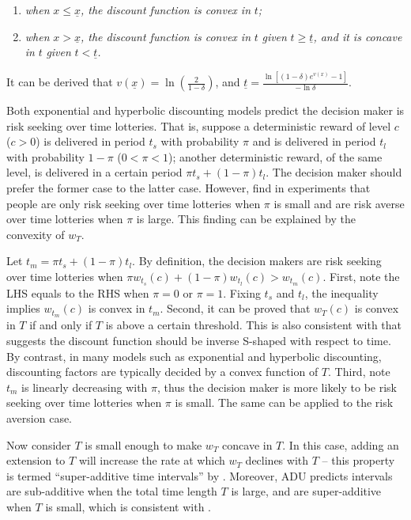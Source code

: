 \documentclass[
  12pt,
]{article}
\providecommand{\tightlist}{%
  \setlength{\itemsep}{0pt}\setlength{\parskip}{0pt}}
\begin{document}
\begin{enumerate}
\def\labelenumi{\arabic{enumi})}
\tightlist
\item
  \emph{when} \(x\leq \underline{x}\)\emph{, the discount function is
  convex in} \(t\)\emph{;}
\item
  \emph{when} \(x > \underline{x}\)\emph{, the discount function is
  convex in} \(t\) \emph{given} \(t\geq \underline{t}\)\emph{, and it is
  concave in} \(t\) \emph{given} \(t<\underline{t}\)\emph{.}
\end{enumerate}

It can be derived that \(v(\underline{x})=\ln(\frac{2}{1-\delta})\), and
\(\underline{t}=\frac{\ln[(1-\delta)e^{v(x)}-1]}{-\ln\delta}\).

Both exponential and hyperbolic discounting models predict the decision
maker is risk seeking over time lotteries. That is, suppose a
deterministic reward of level \(c\) (\(c>0\)) is delivered in period
\(t_s\) with probability \(\pi\) and is delivered in period \(t_l\) with
probability \(1-\pi\) (\(0<\pi<1\)); another deterministic reward, of
the same level, is delivered in a certain period
\(\pi t_s +(1-\pi) t_l\). The decision maker should prefer the former
case to the latter case. However, \citet{onay_intertemporal_2007} find
in experiments that people are only risk seeking over time lotteries
when \(\pi\) is small and are risk averse over time lotteries when
\(\pi\) is large. This finding can be explained by the convexity of
\(w_T\).

Let \(t_m = \pi t_s +(1-\pi) t_l\). By definition, the decision makers
are risk seeking over time lotteries when
\(\pi w_{t_s}(c)+(1-\pi)w_{t_l}(c)>w_{t_m}(c)\). First, note the LHS
equals to the RHS when \(\pi=0\) or \(\pi=1\). Fixing \(t_s\) and
\(t_l\), the inequality implies \(w_{t_m}(c)\) is convex in \(t_m\).
Second, it can be proved that \(w_T(c)\) is convex in \(T\) if and only
if \(T\) is above a certain threshold. This is also consistent with
\citet{takeuchi_non-parametric_2011} that suggests the discount function
should be inverse S-shaped with respect to time. By contrast, in many
models such as exponential and hyperbolic discounting, discounting
factors are typically decided by a convex function of \(T\). Third, note
\(t_m\) is linearly decreasing with \(\pi\), thus the decision maker is
more likely to be risk seeking over time lotteries when \(\pi\) is
small. The same can be applied to the risk aversion case.

Now consider \(T\) is small enough to make \(w_T\) concave in \(T\). In
this case, adding an extension to \(T\) will increase the rate at which
\(w_T\) declines with \(T\) -- this property is termed ``super-additive
time intervals'' by \citet{read_is_2001}. Moreover, ADU predicts
intervals are sub-additive when the total time length \(T\) is large,
and are super-additive when \(T\) is small, which is consistent with
\citet{scholten_discounting_2006}.
\end{document}
